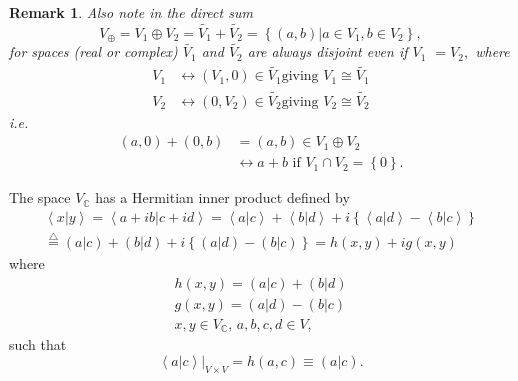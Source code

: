 \documentclass[aps,preprint]{revtex4}
\newtheorem{remark}[theorem]{Remark}
\begin{document}
\begin{remark}
Also note in the direct sum 
\begin{equation}
V_{\oplus }=V_{1}\oplus V_{2}=\widetilde{V_{1}}+\widetilde{V_{2}}=\left\{
\left. \left( a,b\right) \right\vert a\in V_{1},b\in V_{2}\right\} ,
\end{equation}%
for spaces (real or complex) $\widetilde{V_{1}}$ and $\widetilde{V_{2}}$ are
always disjoint even if $V_{1}$ $=V_{2},$ where 
\begin{align}
V_{1}& \longleftrightarrow \left( V_{1},0\right) \in \widetilde{V_{1}}\text{
giving }V_{1}\cong \widetilde{V_{1}} \\
V_{2}& \longleftrightarrow \left( 0,V_{2}\right) \in \widetilde{V_{2}}\text{
giving }V_{2}\cong \widetilde{V_{2}}
\end{align}%
i.e. 
\begin{align}
\left( a,0\right) +\left( 0,b\right) & =\left( a,b\right) \in V_{1}\oplus
V_{2} \\
& \leftrightarrow a+b\text{ if }V_{1}\cap V_{2}=\left\{ 0\right\} .
\end{align}
\end{remark}

The space $V_{\mathbb{C}}$ has a Hermitian inner product defined by 
\begin{gather}
\left\langle \left. x\right\vert y\right\rangle =\left\langle \left.
a+ib\right\vert c+id\right\rangle =\left\langle \left. a\right\vert
c\right\rangle +\left\langle \left. b\right\vert d\right\rangle +i\left\{
\left\langle \left. a\right\vert d\right\rangle -\left\langle \left.
b\right\vert c\right\rangle \right\} \\
\overset{\triangle}{=}\left( \left. a\right\vert c\right) +\left( \left.
b\right\vert d\right) +i\left\{ \left( \left. a\right\vert d\right) -\left(
\left. b\right\vert c\right) \right\} =h\left( x,y\right) +ig\left(
x,y\right)
\end{gather}
where 
\begin{gather}
h\left( x,y\right) =\left( \left. a\right\vert c\right) +\left( \left.
b\right\vert d\right) \\
g\left( x,y\right) =\left( \left. a\right\vert d\right) -\left( \left.
b\right\vert c\right) \\
x,y\in V_{\mathbb{C}},\,a,b,c,d\in V,
\end{gather}
such that 
\begin{equation}
\left. \left\langle \left. a\right\vert c\right\rangle \right\vert _{V\times
V}=h\left( a,c\right) \equiv\left( \left. a\right\vert c\right) .
\end{equation}
\end{document}
